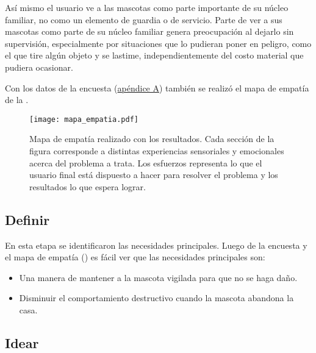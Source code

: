 Así mismo el usuario ve a las mascotas como parte importante de su núcleo familiar, no como un elemento de guardia o de servicio. Parte de ver a sus mascotas como parte de su núcleo familiar genera preocupación al dejarlo sin supervisión, especialmente por situaciones que lo pudieran poner en peligro, como el que tire algún objeto y se lastime, independientemente del costo material que pudiera ocasionar.

Con los datos de la encuesta (\hyperref[ape:tablaencuesta]{apéndice A}) también se realizó el mapa de empatía de la . 


\begin{landscape}
  \begin{figure}
      \centering
      \caption[Mapa de empatía del proyecto.]{Mapa de empatía realizado con los resultados. Cada sección de la figura corresponde a distintas experiencias sensoriales y emocionales acerca del problema a trata. Los esfuerzos representa lo que el usuario final está dispuesto a hacer para resolver el problema y los resultados lo que espera lograr.}
      \label{fig:mapaempatia}
      \texttt{[image: mapa\_empatia.pdf]}
  \end{figure}
\end{landscape}

\subsection{Definir}
\label{sec:definir}

En esta etapa se identificaron las necesidades principales. Luego de la encuesta y el mapa de empatía () es fácil ver que las necesidades principales son:


\begin{itemize}
  \item Una manera de mantener a la mascota vigilada para que no se haga daño.\item Disminuir el comportamiento destructivo cuando la mascota abandona la casa.
\end{itemize}

\subsection{Idear}
\label{sec:idear}

